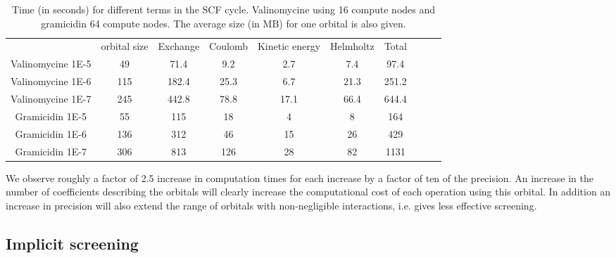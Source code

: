\documentclass{article}
\begin{document}
\begin{table}[t]
\label{tab:prec}
    \centering
    \begin{tabular}{cccccccccc}
&orbital size& Exchange &  Coulomb & Kinetic energy& Helmholtz & Total \\
 Valinomycine 1E-5& 49 & 71.4& 9.2& 2.7 & 7.4& 97.4\\
Valinomycine 1E-6& 115 & 182.4& 25.3& 6.7 & 21.3&251.2\\
Valinomycine 1E-7& 245 & 442.8& 78.8&17.1& 66.4&644.4  \\
 Gramicidin 1E-5&55&115&18& 4& 8& 164\\
  Gramicidin 1E-6&136&312 & 46& 15 & 26& 429\\
  Gramicidin 1E-7&306& 813&126& 28& 82& 1131\\ %
    \end{tabular}
    \caption{Time (in seconds) for different terms in the SCF cycle. Valinomycine using 16 compute nodes and gramicidin 64 compute nodes. The average size (in MB) for one orbital is also given.} %
    \label{tab:times}
\end{table}

We observe roughly a factor of 2.5 increase in computation times for each increase by a factor of ten of the precision. 
An increase in the number of coefficients describing the orbitals will clearly increase the computational cost of each operation using this orbital. In addition an increase in precision will also extend the range of orbitals with non-negligible interactions, i.e. gives less effective screening.



\subsection{Implicit screening}
\end{document}
